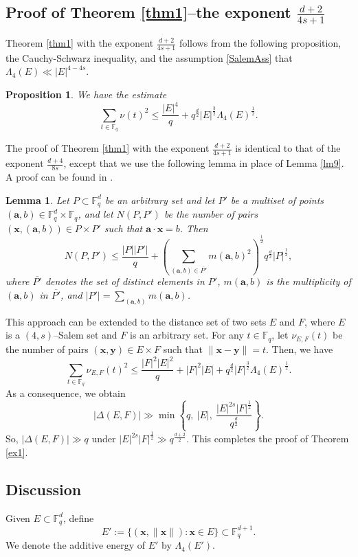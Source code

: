 \documentclass[11pt]{article}
\newtheorem{proposition}[theorem]{Proposition}
\newtheorem{lemma}[theorem]{Lemma}
\newcommand{\Fqd}{\mathbb{F}_q^d}
\begin{document}
\subsection{Proof of Theorem \ref{thm1}--the exponent $\frac{d+2}{4s+1}$} \label{sec6}
Theorem \ref{thm1} with the exponent $\frac{d+2}{4s+1}$ follows from the following proposition, the Cauchy-Schwarz inequality, and the assumption \eqref{SalemAss} that $\Lambda_4(E)\ll |E|^{4-4s}$.
\begin{proposition}\label{propo2}
We have the estimate
  \[\sum_{t\in \mathbb{F}_q}\nu(t)^2\le \frac{|E|^4}{q}+q^{\frac{d}{2}}|E|^{\frac{3}{2}}\Lambda_4(E)^{\frac{1}{2}}.\]
\end{proposition}
The proof of Theorem \ref{thm1} with the exponent $\frac{d+2}{4s+1}$ is identical to that of the exponent $\frac{d+4}{8s}$, except that we use the following lemma in place of Lemma \ref{lm9}. A proof can be found in \cite{VHKPV20}.
\begin{lemma}\label{lm99}
    Let $P \subset \Fqd$ be an arbitrary set and let $P'$ be a multiset of points $(\mathbf{a}, b)\in \mathbb{F}_q^d\times \mathbb{F}_q$, and let $N(P, P')$ be the number of pairs $(\mathbf{x}, (\mathbf{a}, b))\in P\times P'$ such that $\mathbf{a}\cdot \mathbf{x}=b$. Then 
\[
N(P, P') \leq \frac{|P||P'|}{q} + \left(\sum_{(\mathbf{a}, b)\in \overline{P'}}m(\mathbf{a}, b)^{2}\right)^{\frac{1}{2}}q^{\frac{d}{2}} |P|^{\frac{1}{2}},
\]
where $\overline{P'}$ denotes the set of distinct elements in $P'$, $m(\mathbf{a}, b)$ is the multiplicity of $(\mathbf{a}, b)$ in $\overline{P'}$, and $|P'|=\sum_{(\mathbf{a}, b)}m(\mathbf{a}, b)$.
\end{lemma}
This approach can be extended to the distance set of two sets $E$ and $F$, where $E$ is a $(4, s)$--Salem set and $F$ is an arbitrary set. For any $t\in \mathbb{F}_q$, let $\nu_{E, F}(t)$ be the number of pairs $(\mathbf{x}, \mathbf{y})\in E\times F$ such that $\|\mathbf{x}-\mathbf{y}\|=t$. Then, we have 
\[\sum_{t\in \mathbb{F}_q}\nu_{E, F}(t)^2\le \frac{|F|^2|E|^2}{q}+|F|^2|E|+q^{\frac{d}{2}}|F|^{\frac{3}{2}}\Lambda_4(E)^{\frac{1}{2}}.\]
As a consequence, we obtain 
\[|\Delta(E, F)|\gg \min \left\lbrace q,~|E|, ~ \frac{|E|^{2s}|F|^{\frac{1}{2}}}{q^{\frac{d}{2}}} \right\rbrace.\]
So, $|\Delta(E, F)|\gg q$ under $|E|^{2s}|F|^{\frac{1}{2}}\gg q^{\frac{d+2}{2}}$. This completes the proof of Theorem \ref{ex1}.


\subsection{Discussion}
Given $E\subset \mathbb{F}_q^d$, define 
\[E':=\{(\mathbf{x}, \|\mathbf{x}\|)\colon \mathbf{x}\in E\}\subset \mathbb{F}_q^{d+1}.\]
We denote the additive energy of $E'$ by $\Lambda_4(E')$.
\end{document}
